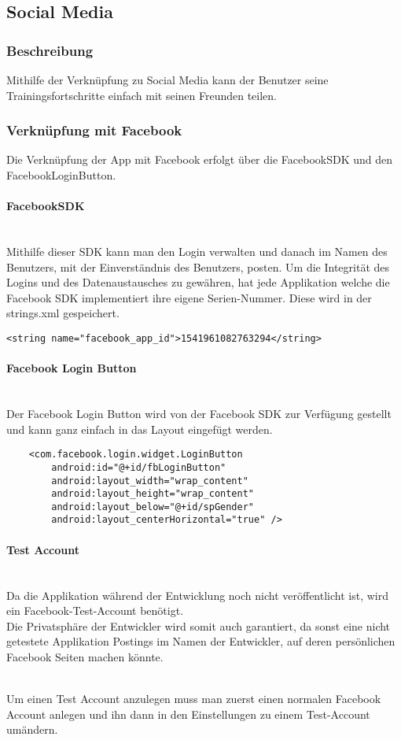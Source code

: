 \documentclass[FIPLY_base.tex]{subfiles}
\begin{document}
\subsection{Social Media}
\subsubsection{Beschreibung}
Mithilfe der Verknüpfung zu Social Media kann der Benutzer seine Trainingsfortschritte einfach mit seinen Freunden teilen. 
\subsubsection{Verknüpfung mit Facebook}
Die Verknüpfung der App mit Facebook erfolgt über die FacebookSDK und den FacebookLoginButton.
\paragraph{FacebookSDK}\ \\
Mithilfe dieser SDK kann man den Login verwalten und danach im Namen des Benutzers, mit der Einverständnis des Benutzers, posten.
Um die Integrität des Logins und des Datenaustausches zu gewähren, hat jede Applikation welche die Facebook SDK implementiert ihre eigene Serien-Nummer.
Diese wird in der strings.xml gespeichert.
\begin{lstlisting}
<string name="facebook_app_id">1541961082763294</string>
\end{lstlisting}
\paragraph{Facebook Login Button}\ \\
Der Facebook Login Button wird von der Facebook SDK zur Verfügung gestellt und kann ganz einfach in das Layout eingefügt werden.
\begin{lstlisting}
    <com.facebook.login.widget.LoginButton
        android:id="@+id/fbLoginButton"
        android:layout_width="wrap_content"
        android:layout_height="wrap_content"
        android:layout_below="@+id/spGender"
        android:layout_centerHorizontal="true" />
\end{lstlisting}

\newpage
\paragraph{Test Account}\ \\
Da die Applikation während der Entwicklung noch nicht veröffentlicht ist, wird ein Facebook-Test-Account benötigt. \ \\
Die Privatsphäre der Entwickler wird somit auch garantiert, da sonst eine nicht getestete Applikation Postings im Namen der Entwickler, auf deren persönlichen Facebook Seiten machen könnte.

\ \\
Um einen Test Account anzulegen muss man zuerst einen normalen Facebook Account anlegen und ihn dann in den Einstellungen zu einem Test-Account umändern.
\end{document}
